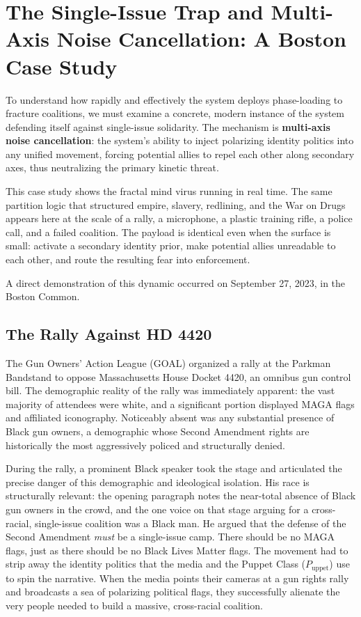 \chapter{The Single-Issue Trap and Multi-Axis Noise Cancellation: A Boston Case Study}
\label{ch:boston_case_study}

To understand how rapidly and effectively the system deploys phase-loading to fracture coalitions, we must examine a concrete, modern instance of the system defending itself against single-issue solidarity. The mechanism is \textbf{multi-axis noise cancellation}: the system's ability to inject polarizing identity politics into any unified movement, forcing potential allies to repel each other along secondary axes, thus neutralizing the primary kinetic threat.

This case study shows the fractal mind virus running in real time. The same partition logic that structured empire, slavery, redlining, and the War on Drugs appears here at the scale of a rally, a microphone, a plastic training rifle, a police call, and a failed coalition. The payload is identical even when the surface is small: activate a secondary identity prior, make potential allies unreadable to each other, and route the resulting fear into enforcement.

A direct demonstration of this dynamic occurred on September 27, 2023, in the Boston Common.

\section{The Rally Against HD 4420}

The Gun Owners' Action League (GOAL) organized a rally at the Parkman Bandstand to oppose Massachusetts House Docket 4420, an omnibus gun control bill. The demographic reality of the rally was immediately apparent: the vast majority of attendees were white, and a significant portion displayed MAGA flags and affiliated iconography. Noticeably absent was any substantial presence of Black gun owners, a demographic whose Second Amendment rights are historically the most aggressively policed and structurally denied.

During the rally, a prominent Black speaker took the stage and articulated the precise danger of this demographic and ideological isolation. His race is structurally relevant: the opening paragraph notes the near-total absence of Black gun owners in the crowd, and the one voice on that stage arguing for a cross-racial, single-issue coalition was a Black man. He argued that the defense of the Second Amendment \textit{must} be a single-issue camp. There should be no MAGA flags, just as there should be no Black Lives Matter flags. The movement had to strip away the identity politics that the media and the Puppet Class ($P_{\text{uppet}}$) use to spin the narrative. When the media points their cameras at a gun rights rally and broadcasts a sea of polarizing political flags, they successfully alienate the very people needed to build a massive, cross-racial coalition.

